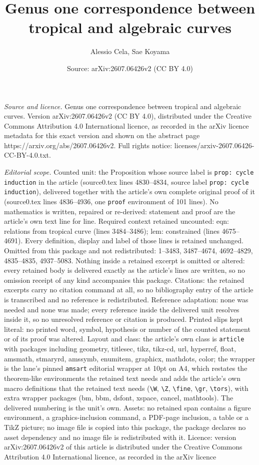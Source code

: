 \documentclass[10pt,a4paper]{amsart}
\title[Genus one correspondence between tropical and algebraic curv]{Genus one correspondence between tropical and algebraic curves}
\author{Alessio Cela, Sae Koyama}
\date{Source: arXiv:2607.06426v2 (CC BY 4.0)}
\begin{document}
\maketitle

\noindent\emph{Source and licence.} Genus one correspondence between tropical and algebraic curves. Version arXiv:2607.06426v2 (CC BY 4.0), distributed under the Creative Commons Attribution 4.0 International licence, as recorded in the arXiv licence metadata for this exact version and shown on the abstract page https://arxiv.org/abs/2607.06426v2. Full rights notice: licenses/arxiv-2607.06426-CC-BY-4.0.txt.\par\smallskip

\noindent\textit{Editorial scope.} Counted unit: the Proposition whose source label is \texttt{prop: cycle induction} in the article (source0.tex lines 4830--4834, source label \texttt{prop: cycle induction}), delivered together with the article's own complete original proof of it (source0.tex lines 4836--4936, one \texttt{proof} environment of 101 lines). No mathematics is written, repaired or re-derived: statement and proof are the article's own text line for line. Required context retained uncounted: eqn: relations from tropical curve (lines 3484--3486); lem: constrained (lines 4675--4691). Every definition, display and label of those lines is retained unchanged. Omitted from this package and not redistributed: 1--3483, 3487--4674, 4692--4829, 4835--4835, 4937--5083. Nothing inside a retained excerpt is omitted or altered: every retained body is delivered exactly as the article's lines are written, so no omission receipt of any kind accompanies this package. Citations: the retained excerpts carry no citation command at all, so no bibliography entry of the article is transcribed and no reference is redistributed. Reference adaptation: none was needed and none was made; every reference inside the delivered unit resolves inside it, so no unresolved reference or citation is produced. Printed slips kept literal: no printed word, symbol, hypothesis or number of the counted statement or of its proof was altered. Layout and class: the article's own class is \texttt{article} with packages including geometry, titlesec, tikz, tikz-cd, url, hyperref, float, amsmath, stmaryrd, amssymb, enumitem, graphicx, mathdots, color; the wrapper is the lane's pinned \texttt{amsart} editorial wrapper at 10pt on A4, which restates the theorem-like environments the retained text needs and adds the article's own macro definitions that the retained text needs (\texttt{\textbackslash W}, \texttt{\textbackslash Z}, \texttt{\textbackslash fine}, \texttt{\textbackslash gr}, \texttt{\textbackslash tors}), with extra wrapper packages (bm, bbm, dsfont, xspace, cancel, mathtools). The delivered numbering is the unit's own. Assets: no retained span contains a figure environment, a graphics-inclusion command, a PDF-page inclusion, a table or a TikZ picture; no image file is copied into this package, the package declares no asset dependency and no image file is redistributed with it. Licence: version arXiv:2607.06426v2 of this article is distributed under the Creative Commons Attribution 4.0 International licence, as recorded in the arXiv licence 
\end{document}
